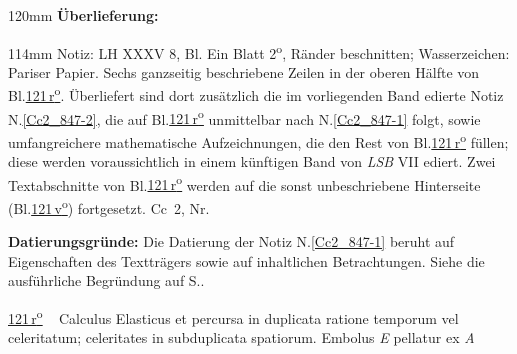 %
\frenchspacing%
\begin{ledgroupsized}[r]{120mm}%
\footnotesize%
\pstart%
\noindent\textbf{Überlieferung:}%
\pend%
\end{ledgroupsized}%
\begin{ledgroupsized}[r]{114mm}%
\footnotesize%
\pstart%
\parindent -6mm%
%
Notiz:
LH XXXV 8, Bl.
Ein Blatt 2\textsuperscript{o},
Ränder beschnitten;
Wasserzeichen: %
Pariser Papier.
Sechs ganzseitig beschriebene Zeilen in der oberen Hälfte von Bl.\;\href{\Scan{LH_35_08_30_121r}}{121\,r\textsuperscript{o}}.
Überliefert sind dort zusätzlich die im vorliegenden Band edierte Notiz N.\;\ref{Cc2_847-2}, die auf Bl.\;\href{\Scan{LH_35_08_30_121r}}{121\,r\textsuperscript{o}} unmittelbar nach N.\;\ref{Cc2_847-1} folgt, sowie umfangreichere mathematische Aufzeichnungen, die den Rest von Bl.\;\href{\Scan{LH_35_08_30_121r}}{121\,r\textsuperscript{o}} füllen; diese werden voraussichtlich in einem künftigen Band von \textit{LSB} VII ediert.
Zwei Textabschnitte von Bl.\;\href{\Scan{LH_35_08_30_121r}}{121\,r\textsuperscript{o}} werden auf die sonst unbeschriebene Hinterseite (Bl.\;\href{\Scan{LH_35_08_30_121v}}{121\,v\textsuperscript{o}}) fortgesetzt.
\newline%
Cc~2, Nr.
\pend%
\end{ledgroupsized}%
\vspace{5mm}%
\begin{ledgroup}%
\footnotesize%
\pstart%
\noindent%
\textbf{Datierungsgründe:}
Die Datierung der Notiz N.\;\ref{Cc2_847-1} beruht auf Eigenschaften des Textträgers sowie auf inhaltlichen Betrachtungen.
Siehe die ausführliche Begründung auf S.\;\pageref{Cc2_847-1-dat}.%
\pend%
\end{ledgroup}%
%
\frenchspacing%
\vspace{8mm}%
\normalsize%
\pstart%
\noindent%
\lbrack%
\href{\Scan{LH_35_08_30_121r}}%
{121\,r\textsuperscript{o}}%
\rbrack\ %
Calculus Elasticus%
et
percursa%
in duplicata ratione temporum%
vel celeritatum;%
celeritates
in subduplicata spatiorum.%
\pend%
\pstart%
Embolus \textit{E}%
pellatur ex \textit{A}
